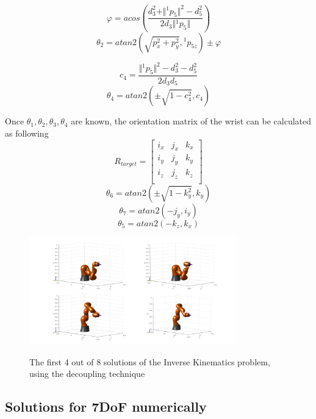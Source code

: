 \begin{equation}
φ = acos \left( \frac{d_3^2 + \Vert{}^1p_{5}\Vert ^2 - d_5^2}{2d_3 \Vert{}^1p_{5}\Vert} \right)
\end{equation}
\begin{equation}
θ_2 = atan2 \left( \sqrt{p_x^2 + p_y^2}, {}^1p_{5z} \right) \pm φ
\end{equation}

\[ c_4 = \frac{ \Vert{}^1p_{5}\Vert ^2 - d_3^2 - d_5^2 }{2d_3d_5} \]
\begin{equation}
θ_4 = atan2 \left( \pm \sqrt{1 - c_4^2}, c_4 \right)
\end{equation}

Once $θ_1,θ_2,θ_3,θ_4$ are known, the orientation matrix of the wrist can be calculated as following
\[
R_{target} = 
\begin{bmatrix}
i_x & j_x & k_x\\
i_y & j_y & k_y\\
i_z & j_z & k_z\\
\end{bmatrix}
\]
\begin{equation}
θ_6 = atan2 \left( \pm \sqrt{1-k_y^2}, k_y \right)
\end{equation}
\[
θ_7 = atan2 \left( -j_y, i_y \right)
\]
\[
θ_5 = atan2 \left( - k_z, k_x \right)
\]

\begin{center}
\begin{figure}[!htb]
\centering
\includegraphics[width=0.8\textwidth]{images/ik-4-solutions.png}\\
\caption{The first 4 out of 8 solutions of the Inverse Kinematics problem, using the decoupling technique}
\end{figure}
\end{center}


\subsection{Solutions for 7DoF numerically}

